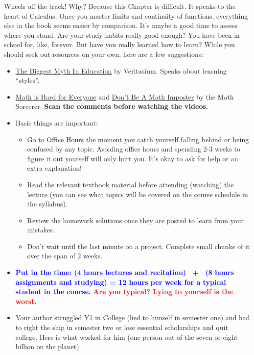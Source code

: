 \begin{tcolorbox}[title = {This can be the Point where the Wheels Come off the Track!}, sharp corners, colback=lightgold, colframe=black, coltitle=white, breakable, fonttitle=\bfseries]

Wheels off the track! Why? Because this Chapter is difficult. It speaks to the heart of Calculus. Once you master limits and continuity of functions, everything else in the book seems easier by comparison. It's maybe a good time to assess where you stand. Are your study habits really good enough? You have been in school for, like, forever. But have you really learned how to learn? While you should seek out resources on your own, here are a few suggestions:
\begin{itemize}
\item \href{https://youtu.be/rhgwIhB58PA}{The Biggest Myth In Education} by Veritasium. Speaks about learning ``styles''.
\item \href{https://youtu.be/n3kIPsO0Qv8}{Math is Hard for Everyone} and \href{https://www.youtube.com/watch?v=d5gJ1xvTQv4}{Don't Be A Math Imposter} by the Math Sorcerer. \textbf{Scan the comments before watching the videos.}
\item Basic things are important:
\begin{itemize}
   \item Go to Office Hours the moment you catch yourself falling behind or being confused by any topic. Avoiding office hours and spending 2-3 weeks to figure it out yourself will only hurt you. It's okay to ask for help or an extra explanation!
\item Read the relevant textbook material before attending (watching) the lecture (you can see what topics will be covered on the course schedule in the syllabus).
\item Review the homework solutions once they are posted to learn from your mistakes.
\item Don't wait until the last minute on a project. Complete small chunks of it over the span of 2 weeks.
\end{itemize}
\item \textcolor{blue}{\bf Put in the time: (4 hours lectures and recitation)~ + ~(8 hours assignments and studying) = 12 hours per week for a typical student in the course.} \textcolor{red}{\bf Are you typical? Lying to yourself is the worst.}
\item Your author struggled Y1 in College (lied to himself in semester one) and had to right the ship in semester two or lose essential scholarships and quit college. Here is what worked for him (one person out of the seven or eight billion on the planet).  

\end{itemize}
\end{tcolorbox}
